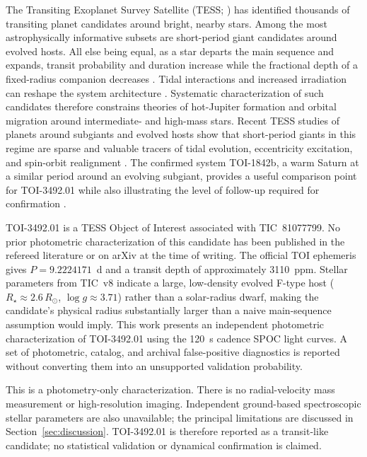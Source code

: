\documentclass[11pt]{article}
\begin{document}
The Transiting Exoplanet Survey Satellite (TESS; \citealt{Ricker2015}) has
identified thousands of transiting planet candidates around bright,
nearby stars.  Among the most astrophysically informative subsets are
short-period giant candidates around evolved hosts.  All else being equal, as
a star departs the main sequence and expands, transit probability and duration increase
while the fractional depth of a fixed-radius companion decreases
\citep{Seager2003}.  Tidal interactions and increased irradiation can reshape
the system architecture \citep{Grunblatt2022,Grunblatt2023,Saunders2024}.
Systematic characterization of such candidates therefore constrains
theories of hot-Jupiter formation and orbital migration around intermediate-
and high-mass stars.  Recent TESS studies of planets around subgiants and
evolved hosts show that short-period giants in this regime are sparse and
valuable tracers of tidal evolution, eccentricity excitation, and spin-orbit
realignment \citep{Grunblatt2022,Grunblatt2023,Chontos2024,Saunders2024}.  The
confirmed system TOI-1842b, a warm Saturn at a similar period around an
evolving subgiant, provides a useful comparison point for TOI-3492.01 while
also illustrating the level of follow-up required for confirmation
\citep{Wittenmyer2022}.

TOI-3492.01 is a TESS Object of Interest associated with TIC~81077799.
No prior photometric characterization of this candidate has been published
in the refereed literature or on arXiv at the time of writing.
The official TOI ephemeris gives $P = 9.2224171$~d and a transit depth of
approximately 3110~ppm.  Stellar parameters from TIC~v8 \citep{Stassun2019}
indicate a large, low-density evolved F-type host ($R_\star \approx 2.6\,R_\odot$,
$\log g \approx 3.71$) rather than a solar-radius dwarf, making the candidate's
physical radius substantially larger than a naive main-sequence assumption
would imply.  This work presents an independent photometric
characterization of TOI-3492.01 using the 120~s cadence SPOC light curves.
A set of photometric, catalog, and archival false-positive diagnostics is
reported without converting them into an unsupported validation probability.

This is a photometry-only characterization.  There is no radial-velocity
mass measurement or high-resolution imaging.  Independent ground-based
spectroscopic stellar parameters are also unavailable; the principal
limitations are discussed in Section~\ref{sec:discussion}.
TOI-3492.01 is therefore reported as a transit-like candidate; no statistical
validation or dynamical confirmation is claimed.
\end{document}
